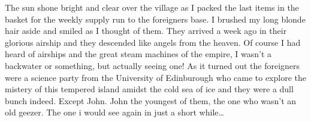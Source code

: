The sun shone bright and clear over the village as I packed the last items in the basket for the weekly supply run to the foreigners base. I brushed my long blonde hair aside and smiled as I thought of them. They arrived a week ago in their glorious airship and they descended like angels from the heaven. Of course I had heard of airships and the great steam machines of the empire, I wasn't a backwater or something, but actually seeing one! As it turned out the foreigners were a science party from the University of Edinburough who came to explore the mistery of this tempered island amidst the cold sea of ice and they were a dull bunch indeed. Except John. John the youngest of them, the one who wasn't an old geezer. The one i would see again in just a short while\dots
